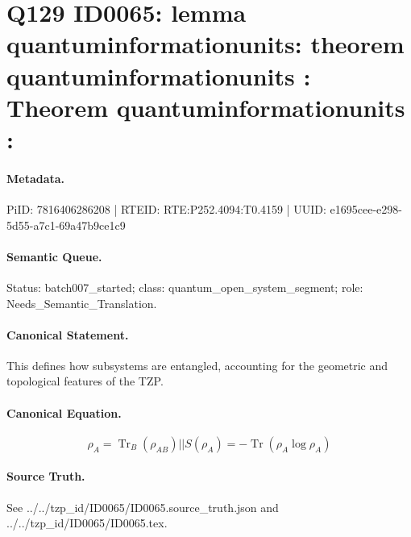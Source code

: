 \section*{Q129 ID0065: lemma quantuminformationunits: theorem quantuminformationunits : Theorem quantuminformationunits :}
\paragraph{Metadata.}
PiID: 7816406286208 | RTEID: RTE:P252.4094:T0.4159 | UUID: e1695cee-e298-5d55-a7c1-69a47b9ce1c9

\paragraph{Semantic Queue.}
Status: batch007\_started; class: quantum\_open\_system\_segment; role: Needs\_Semantic\_Translation.

\paragraph{Canonical Statement.}
This defines how subsystems are entangled, accounting for the geometric and topological features of the TZP.

\paragraph{Canonical Equation.}
\[
\rho_{A} = \operatorname{Tr}_{B}(\rho_{AB}) || S(\rho_{A}) = -\operatorname{Tr}\!\left(\rho_{A}\log\rho_{A}\right)
\]

\paragraph{Source Truth.}
See ../../tzp\_id/ID0065/ID0065.source\_truth.json and ../../tzp\_id/ID0065/ID0065.tex.

